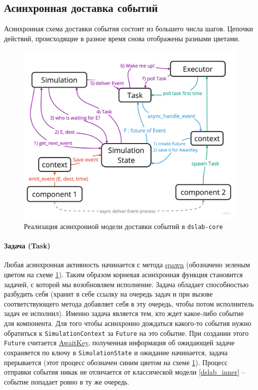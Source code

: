 \subsection{Асинхронная доставка событий}
Асинхронная схема доставки события состоит из большего числа шагов. Цепочки действий, происходящие в разное время снова отображены разными цветами. 
\begin{figure}[H]
    \centering
    \includegraphics[width=\linewidth]{images/async-dslab-core-new.pdf}
    \caption{Реализация асинхронной модели доставки событий в \texttt{dslab-core}}
    \label{async_dslab_inner}
\end{figure}

\paragraph{Задача (Task)}
Любая асинхронная активность начинается с метода \hyperref[spawn]{spawn} (обозначено зеленым цветом на схеме \ref{async_dslab_inner}). Таким образом корневая асинхронная функция становится задачей, с которой мы возобновляем исполнение. Задача обладает способностью разбудить себя (хранит в себе ссылку на очередь задач и при вызове соответствующего метода добавляет себя в эту очередь, чтобы потом исполнитель задач ее исполнил). Именно задача является тем, кто ждет какое-либо событие для компонента. Для того чтобы асинхронно дождаться какого-то события нужно обратиться к \texttt{SimulationContext} за \texttt{Future} на это событие. При создании этого \texttt{Future} считается \hyperref[awaitkey]{AwaitKey}, полученная информация об ожидающей задаче сохраняется по ключу в \texttt{SimulationState} и ожидание начинается, задача прерывается (этот процесс обозначен синим цветом на схеме \ref{async_dslab_inner}). Процесс отправки события никак не отличается от классической модели \ref{dslab_inner}  -- событие попадает ровно в ту же очередь.

